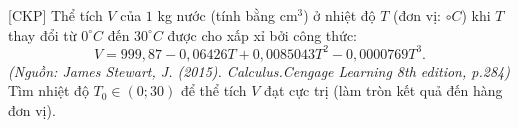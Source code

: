 \begin{bt}%
[CKP]%
	Thể tích $V$ của $1$ kg nước (tính bằng $\text{cm}^3$) ở nhiệt độ $T$ (đơn vị: $\circ C$) khi $T$ thay đổi từ $0^\circ C$ đến $30^\circ C$ được cho xấp xỉ bởi công thức:
	$$V=999{,}87-0{,}06426T+0,0085043T^2-0{,}0000769T^3.$$
	\textit{(Nguồn: James Stewart, J. (2015). Calculus.Cengage Learning 8th edition, p.284)}\\ Tìm nhiệt độ $T_0 \in \left(0;30\right)$ để thể tích $V$ đạt cực trị (làm tròn kết quả đến hàng đơn vị).
\end{bt}

